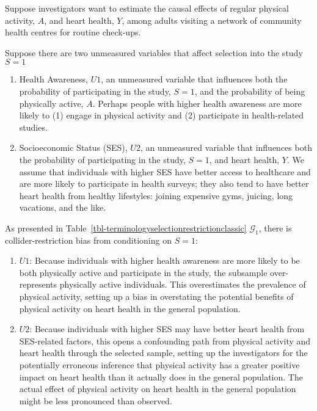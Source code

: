 \documentclass[
  single column]{article}
\begin{document}
Suppose investigators want to estimate the causal effects of regular
physical activity, \(A\), and heart health, \(Y\), among adults visiting
a network of community health centres for routine check-ups.

Suppose there are two unmeasured variables that affect selection into
the study \(S=1\)

\begin{enumerate}
\def\labelenumi{\arabic{enumi}.}
\item
  Health Awareness, \(U1\), an unmeasured variable that influences both
  the probability of participating in the study, \(\boxed{S = 1}\), and
  the probability of being physically active, \(A\). Perhaps people with
  higher health awareness are more likely to (1) engage in physical
  activity and (2) participate in health-related studies.
\item
  Socioeconomic Status (SES), \(U2\), an unmeasured variable that
  influences both the probability of participating in the study,
  \(\boxed{S = 1}\), and heart health, \(Y\). We assume that individuals
  with higher SES have better access to healthcare and are more likely
  to participate in health surveys; they also tend to have better heart
  health from healthy lifestyles: joining expensive gyms, juicing, long
  vacations, and the like.
\end{enumerate}

As presented in Table~\ref{tbl-terminologyselectionrestrictionclassic}
\(\mathcal{G}_1\), there is collider-restriction bias from conditioning
on \(S=1\):

\begin{enumerate}
\def\labelenumi{\arabic{enumi}.}
\item
  \textbf{\(U1\)}: Because individuals with higher health awareness are
  more likely to be both physically active and participate in the study,
  the subsample over-represents physically active individuals. This
  overestimates the prevalence of physical activity, setting up a bias
  in overstating the potential benefits of physical activity on heart
  health in the general population.
\item
  \textbf{\(U2\)}: Because individuals with higher SES may have better
  heart health from SES-related factors, this opens a confounding path
  from physical activity and heart health through the selected sample,
  setting up the investigators for the potentially erroneous inference
  that physical activity has a greater positive impact on heart health
  than it actually does in the general population. The actual effect of
  physical activity on heart health in the general population might be
  less pronounced than observed.
\end{enumerate}
\end{document}
